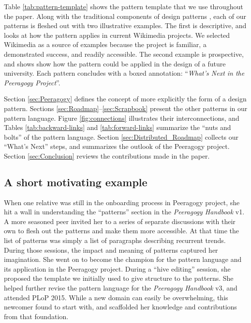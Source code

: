 Table \ref{tab:pattern-template} shows the pattern template that we use throughout the paper.  
Along with the traditional components of design patterns \cite{meszaros1998pattern}, each of our patterns is fleshed out with two illustrative examples.  The first is descriptive, and looks at how the pattern applies in current Wikimedia projects.  We selected Wikimedia as a source of examples because the project is familiar, a demonstrated success, and readily accessible.  The second example is prospective, and shows show how the pattern could be applied in the design of a future university.  Each pattern concludes with a boxed annotation: ``\emph{What's Next in the Peeragogy Project}''.

Section \ref{sec:Peeragogy} defines the concept of  more explicitly the form of a design pattern.  Sections \ref{sec:Roadmap}--\ref{sec:Scrapbook} present the other patterns in our pattern language. Figure \ref{fig:connections} illustrates their interconnections, and Tables \ref{tab:backward-links} and \ref{tab:forward-links} summarize the ``nuts and bolts'' of the pattern language.
Section \ref{sec:Distributed_Roadmap} collects our ``What's Next'' steps, and summarizes the outlook of the Peeragogy project.  Section \ref{sec:Conclusion} reviews the contributions made in the paper.%

\subsection*{A short motivating example}
When one relative  was still in the onboarding process in Peeragogy project, she hit a wall in understanding the ``patterns'' section in the \emph{Peeragogy Handbook} v1.  A more seasoned peer invited her to a series of separate discussions with their own  to flesh out the patterns and make them more accessible.  At that time the list of patterns was simply a list of paragraphs describing recurrent trends.  During those sessions, the impact and meaning of patterns captured her imagination.  She went on to become the champion for the pattern language and its application in the Peeragogy project.  During a ``hive editing'' session, she proposed the template we initially used to give structure to the patterns.  She helped further revise the pattern language for the \emph{Peeragogy Handbook}  v3, and attended PLoP 2015.  While a new domain can easily be overwhelming, this newcomer found  to start with, and scaffolded her knowledge and contributions from that foundation.


